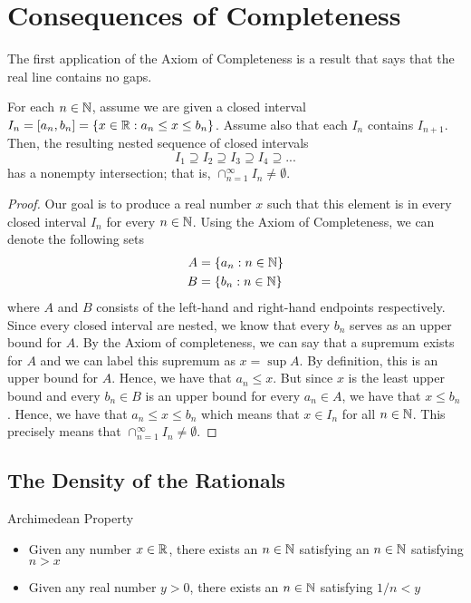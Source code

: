 % 

\section{Consequences of Completeness}

The first application of the Axiom of Completeness is a result that says that the real line contains no gaps. 

\begin{theorem}{}{}
        For each \( n \in \mathbb{N} \), assume we are given a closed interval \( I_n = [a_n, b_n ] = \{ x \in \mathbb{R} : a_n \leq x \leq b_n \} \). Assume also that each \( I_n \) contains \( I_{n+1}\). Then, the resulting nested sequence of closed intervals 
        \[ I_1 \supseteq I_2 \supseteq I_3 \supseteq I_4 \supseteq ... \]
        has a nonempty intersection; that is, \( \cap_{n=1}^{\infty} I_n \neq \emptyset \).
    \end{theorem}

\begin{proof}
    Our goal is to produce a real number \( x \) such that this element is in every closed interval \( I_n \) for every \( n \in \mathbb{N} \). Using the Axiom of Completeness, we can denote the following sets 
    \begin{align*} A &= \{  a_n : n \in \mathbb{N}  \} \\ 
                   B &= \{  b_n : n \in \mathbb{N}  \}
     \end{align*} 
    where \( A \) and \( B \) consists of the left-hand and right-hand endpoints respectively. Since every closed interval are nested, we know that every \( b_n \) serves as an upper bound for \( A \). By the Axiom of completeness, we can say that a supremum exists for \( A \) and we can label this supremum as \( x = \sup A \). By definition, this is an upper bound for \( A \). Hence, we have that \( a_n \leq x \). But since \( x \) is the least upper bound and every \( b_n \in B \) is an upper bound for every \( a_n \in A \), we have that \( x \leq b_n \). Hence, we have that \( a_n \leq x \leq b_n \) which means that \( x \in I_n \) for all \( n \in \mathbb{N} \). This precisely means that \( \cap_{n=1}^{\infty} I_n \neq \emptyset \).
\end{proof}

\subsection{The Density of the Rationals }

\begin{theorem}{Archimedean Property}{}
    \begin{itemize}
        
        \item Given any number \( x \in \mathbb{R} \), there exists an \( n \in \mathbb{N} \) satisfying an \( n \in \mathbb{N} \) satisfying \( n > x \)
        \item Given any real number \( y > 0 \), there exists an \( n \in \mathbb{N} \) satisfying \( 1/n < y \)

    \end{itemize}
    
\end{theorem}

